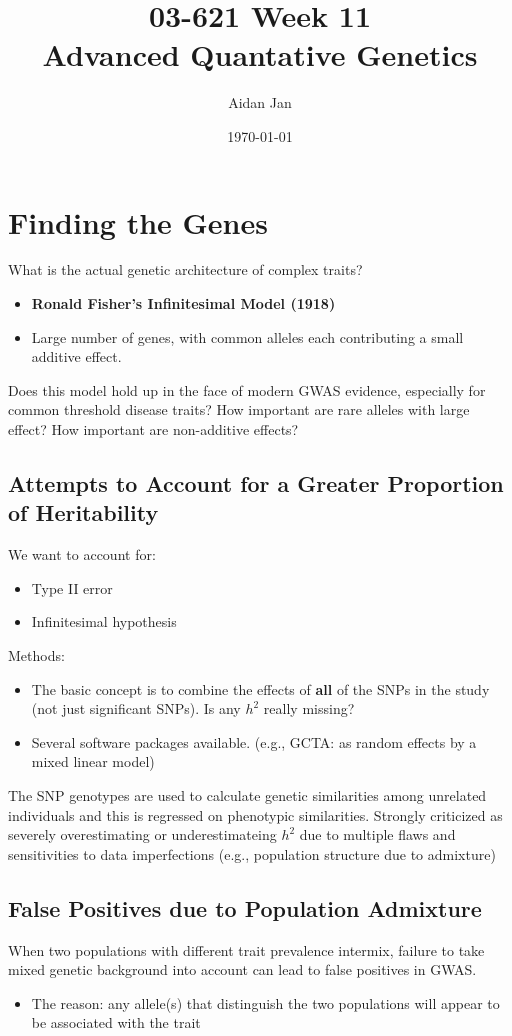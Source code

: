 \documentclass[10pt]{article}
\title{03-621 Week 11 \\ \large{Advanced Quantative Genetics}}
\author{Aidan Jan}
\date{\today}
\begin{document}
\maketitle

\section*{Finding the Genes}
What is the actual genetic architecture of complex traits?
\begin{itemize}
	\item \textbf{Ronald Fisher's Infinitesimal Model (1918)}
	\item Large number of genes, with common alleles each contributing a small additive effect.
\end{itemize}
Does this model hold up in the face of modern GWAS evidence, especially for common threshold disease traits?  How important are rare alleles with large effect?  How important are non-additive effects?

\subsection*{Attempts to Account for a Greater Proportion of Heritability}
We want to account for:
\begin{itemize}
	\item Type II error
	\item Infinitesimal hypothesis
\end{itemize}
Methods:
\begin{itemize}
	\item The basic concept is to combine the effects of \textbf{all} of the SNPs in the study (not just significant SNPs).  Is any $h^2$ really missing?
    \item Several software packages available.  (e.g., GCTA: as random effects by a mixed linear model)
\end{itemize}
The SNP genotypes are used to calculate genetic similarities among unrelated individuals and this is regressed on phenotypic similarities.  Strongly criticized as severely overestimating or underestimateing $h^2$ due to multiple flaws and sensitivities to data imperfections (e.g., population structure due to admixture)

\subsection*{False Positives due to Population Admixture}
When two populations with different trait prevalence intermix, failure to take mixed genetic background into account can lead to false positives in GWAS.
\begin{itemize}
	\item The reason: any allele(s) that distinguish the two populations will appear to be associated with the trait
\end{itemize}
\end{document}
